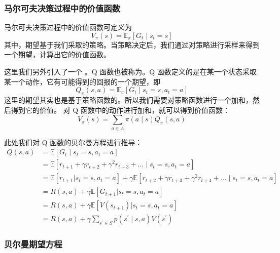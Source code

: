 \subsubsection{马尔可夫决策过程中的价值函数} 

马尔可夫决策过程中的价值函数可定义为
\begin{equation}
  V_{\pi}(s)=\mathbb{E}_{\pi}\left[G_{t} \mid s_{t}=s\right] 
  \label{eq:MDP_value}
\end{equation}
其中，期望基于我们采取的策略。当策略决定后，我们通过对策略进行采样来得到一个期望，计算出它的价值函数。

这里我们另外引入了一个 。Q 函数也被称为。Q 函数定义的是在某一个状态采取某一个动作，它有可能得到的回报的一个期望，即
\begin{equation}
  Q_{\pi}(s, a)=\mathbb{E}_{\pi}\left[G_{t} \mid s_{t}=s, a_{t}=a\right] 
  \label{eq:q_def}
\end{equation}
这里的期望其实也是基于策略函数的。所以我们需要对策略函数进行一个加和，然后得到它的价值。
对 Q 函数中的动作进行加和，就可以得到价值函数：
\begin{equation}
  V_{\pi}(s)=\sum_{a \in A} \pi(a \mid s) Q_{\pi}(s, a)
  \label{eq:q_to_v}
\end{equation}
 
此处我们对 Q 函数的贝尔曼方程进行推导：
\begin{equation}
  \begin{aligned}
    Q(s,a)&=\mathbb{E}\left[G_{t} \mid s_{t}=s,a_{t}=a\right]\\
    &=\mathbb{E}\left[r_{t+1}+\gamma r_{t+2}+\gamma^{2} r_{t+3}+\ldots \mid s_{t}=s,a_{t}=a\right]  \\
    &=\mathbb{E}\left[r_{t+1}|s_{t}=s,a_{t}=a\right] +\gamma \mathbb{E}\left[r_{t+2}+\gamma r_{t+3}+\gamma^{2} r_{t+4}+\ldots \mid s_{t}=s,a_{t}=a\right]\\
    &=R(s,a)+\gamma \mathbb{E}[G_{t+1}|s_{t}=s,a_{t}=a] \\
    &=R(s,a)+\gamma \mathbb{E}[V(s_{t+1})|s_{t}=s,a_{t}=a]\\
    &=R(s,a)+\gamma \sum_{s^{\prime} \in S} p\left(s^{\prime} \mid s,a\right) V\left(s^{\prime}\right)
    \end{aligned}
  \label{eq:}
\end{equation}

\subsubsection{贝尔曼期望方程} 

